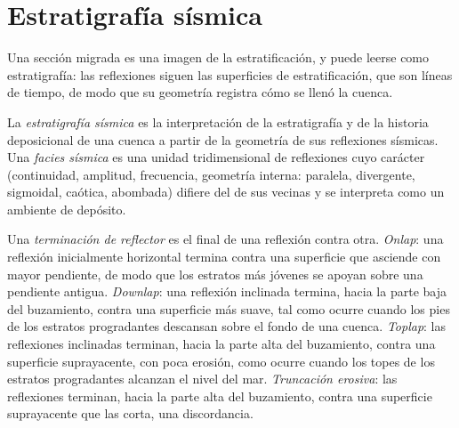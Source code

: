 \section{Estratigrafía sísmica}

Una sección migrada es una imagen de la estratificación, y puede leerse como
estratigrafía: las reflexiones siguen las superficies de estratificación, que
son líneas de tiempo, de modo que su geometría registra cómo se llenó la cuenca.

\begin{definition}\label{def:b3:exploration-seismology:seismic-stratigraphy}
La \emph{estratigrafía sísmica} es la interpretación
de la estratigrafía y de la historia deposicional de una cuenca a partir de la
geometría de sus reflexiones sísmicas. Una \emph{facies sísmica} es una
unidad tridimensional de reflexiones cuyo carácter (continuidad, amplitud,
frecuencia, geometría interna: paralela, divergente, sigmoidal, caótica, abombada)
difiere del de sus vecinas y se interpreta como un
ambiente de depósito.
\end{definition}

\begin{definition}\label{def:b3:exploration-seismology:terminations}
Una \emph{terminación de reflector} es el final de una
reflexión contra otra. \emph{Onlap}: una reflexión inicialmente horizontal
termina contra una superficie que asciende con mayor pendiente, de modo que los
estratos más jóvenes se apoyan sobre una pendiente antigua. \emph{Downlap}: una reflexión inclinada
termina, hacia la parte baja del buzamiento, contra una superficie más suave, tal como
ocurre cuando los pies de los estratos progradantes descansan sobre el fondo de una cuenca. \emph{Toplap}: las
reflexiones inclinadas terminan, hacia la parte alta del buzamiento, contra una superficie suprayacente, con poca erosión, como
ocurre cuando los topes de los estratos progradantes alcanzan el nivel del mar. \emph{Truncación
erosiva}: las reflexiones terminan, hacia la parte alta del buzamiento, contra una
superficie suprayacente que las corta, una discordancia.
\end{definition}

